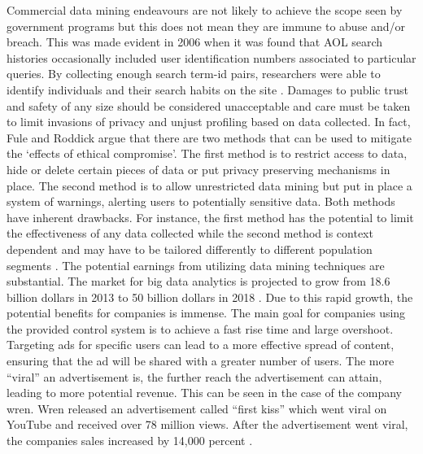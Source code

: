 \documentclass[12pt,letterpaper]{article}
\begin{document}
Commercial data mining endeavours are not likely to achieve the scope seen by government programs but this does not mean they are immune to abuse and/or breach.  This was made evident in 2006 when it was found that AOL search histories occasionally included user identification numbers associated to particular queries.  By collecting enough search term-id pairs, researchers were able to identify individuals and their search habits on the site \cite{data mining 9}.   Damages to public trust and safety of any size should be considered unacceptable and care must be taken to limit invasions of privacy and unjust profiling based on data collected.  In fact, Fule and Roddick argue \cite{data mining 10} that there are two methods that can be used to mitigate the ‘effects of ethical compromise’.  The first method is to restrict access to data, hide or delete certain pieces of data or put privacy preserving mechanisms in place.  The second method is to allow unrestricted data mining but put in place a system of warnings, alerting users to potentially sensitive data.  Both methods have inherent drawbacks.  For instance, the first method has the potential to limit the effectiveness of any data collected while the second method is context dependent and may have to be tailored differently to different population segments \cite{data mining 11}.  
The potential earnings from utilizing data mining techniques are substantial. The market for big data analytics is projected to grow from 18.6 billion dollars in 2013 to 50 billion dollars in 2018 \cite{data mining 11}.  Due to this rapid growth, the potential benefits for companies is immense. The main goal for companies using the provided control system is to achieve a fast rise time and large overshoot. Targeting ads for specific users can lead to a more effective spread of content, ensuring that the ad will be shared with a greater number of users.  The more “viral” an advertisement is, the further reach the advertisement can attain, leading to more potential revenue. This can be seen in the case of the company wren. Wren released an advertisement called “first kiss” which went viral on YouTube and received over 78 million views. After the advertisement went viral, the companies sales increased by 14,000 percent \cite{data mining 12}.
\end{document}
